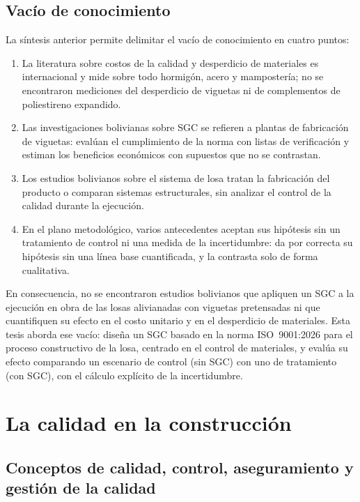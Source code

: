 \subsection{Vacío de conocimiento}

La síntesis anterior permite delimitar el vacío de conocimiento en cuatro puntos:
\begin{enumerate}
  \item La literatura sobre costos de la calidad y desperdicio de materiales es internacional y mide sobre todo hormigón, acero y mampostería; no se encontraron mediciones del desperdicio de viguetas ni de complementos de poliestireno expandido.
  \item Las investigaciones bolivianas sobre SGC se refieren a plantas de fabricación de viguetas: evalúan el cumplimiento de la norma con listas de verificación y estiman los beneficios económicos con supuestos que no se contrastan.
  \item Los estudios bolivianos sobre el sistema de losa tratan la fabricación del producto o comparan sistemas estructurales, sin analizar el control de la calidad durante la ejecución.
  \item En el plano metodológico, varios antecedentes aceptan sus hipótesis sin un tratamiento de control ni una medida de la incertidumbre: \textcite[p.~57]{delavega2023} da por correcta su hipótesis sin una línea base cuantificada, y \textcite[p.~7]{mamanigutierrez2018} la contrasta solo de forma cualitativa.
\end{enumerate}
En consecuencia, no se encontraron estudios bolivianos que apliquen un SGC a la ejecución en obra de las losas alivianadas con viguetas pretensadas ni que cuantifiquen su efecto en el costo unitario y en el desperdicio de materiales. Esta tesis aborda ese vacío: diseña un SGC basado en la norma ISO~9001:2026 para el proceso constructivo de la losa, centrado en el control de materiales, y evalúa su efecto comparando un escenario de control (sin SGC) con uno de tratamiento (con SGC), con el cálculo explícito de la incertidumbre.

\section{La calidad en la construcción}
\label{sec:calidad-construccion}

\subsection{Conceptos de calidad, control, aseguramiento y gestión de la calidad}

